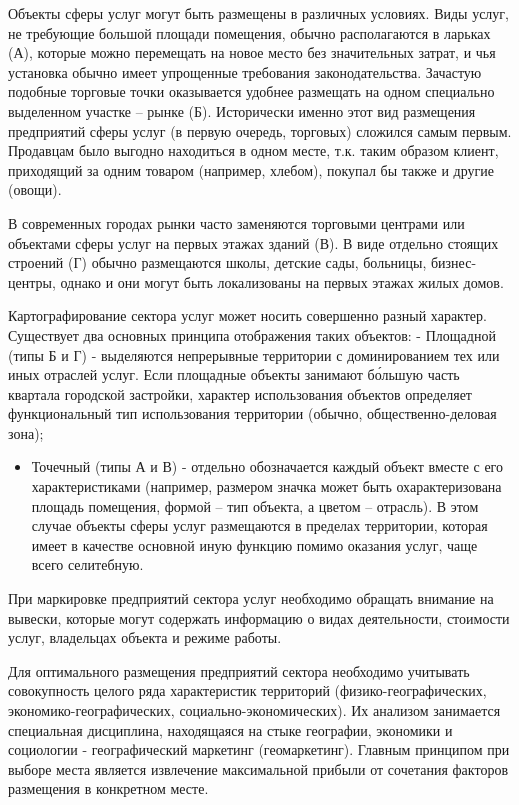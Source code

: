 \documentclass[
  11pt,
]{book}
\providecommand{\tightlist}{%
  \setlength{\itemsep}{0pt}\setlength{\parskip}{0pt}}
\begin{document}
Объекты сферы услуг могут быть размещены в различных условиях. Виды услуг, не требующие большой площади помещения,
обычно располагаются в ларьках (А), которые можно перемещать на новое место без значительных затрат, и чья установка обычно имеет упрощенные требования законодательства. Зачастую подобные торговые точки оказывается удобнее размещать на одном специально выделенном участке -- рынке (Б). Исторически именно этот вид размещения предприятий сферы услуг (в первую очередь, торговых)
сложился самым первым. Продавцам было выгодно находиться в одном месте, т.к. таким образом клиент, приходящий за одним товаром (например, хлебом), покупал бы также и другие (овощи).

В современных городах рынки часто заменяются торговыми центрами или объектами сферы услуг на первых этажах зданий
(В). В виде отдельно стоящих строений (Г) обычно размещаются школы, детские сады, больницы, бизнес-центры, однако и они могут быть локализованы на первых этажах жилых домов.

Картографирование сектора услуг может носить совершенно разный характер. Существует два основных принципа отображения
таких объектов:
- Площадной (типы Б и Г) - выделяются непрерывные территории с доминированием тех или иных отраслей услуг. Если
площадные объекты занимают бо́льшую часть квартала городской застройки, характер использования объектов определяет функциональный тип использования территории (обычно, общественно-деловая зона);

\begin{itemize}
\tightlist
\item
  Точечный (типы А и В) - отдельно обозначается каждый объект вместе с его характеристиками (например, размером
  значка может быть охарактеризована площадь помещения, формой -- тип объекта, а цветом -- отрасль). В этом случае объекты сферы услуг размещаются в пределах территории, которая имеет в качестве основной иную функцию помимо оказания услуг, чаще всего селитебную.
\end{itemize}

При маркировке предприятий сектора услуг необходимо обращать внимание на вывески, которые могут содержать информацию о
видах деятельности, стоимости услуг, владельцах объекта и режиме работы.

Для оптимального размещения предприятий сектора необходимо учитывать совокупность целого ряда характеристик территорий
(физико-географических, экономико-географических, социально-экономических). Их анализом занимается специальная дисциплина, находящаяся на стыке географии, экономики и социологии - географический маркетинг (геомаркетинг). Главным принципом при выборе места является извлечение максимальной прибыли от сочетания факторов размещения в конкретном месте.
\end{document}
